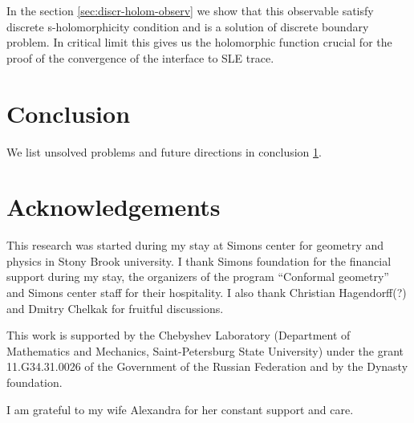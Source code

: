 \documentclass[12pt]{article}
\begin{document}
In the section \ref{sec:discr-holom-observ} we show that this observable satisfy discrete s-holomorphicity
condition and is a solution of discrete boundary problem. In critical limit this gives us the
holomorphic function crucial for the proof of the convergence of the interface to SLE trace.

\section{Conclusion}
\label{sec:conclusion}

We list unsolved problems and future directions in conclusion \ref{sec:conclusion}.


\section*{Acknowledgements}
\label{sec:acknowledgements}

This research was started during my stay at Simons center for geometry and physics in Stony Brook
university. I thank Simons foundation for the financial support during my stay, the organizers of
the program ``Conformal geometry'' and Simons center staff for their hospitality. I also thank
Christian Hagendorff(?) and Dmitry Chelkak for fruitful discussions. 

This work  is supported by
the Chebyshev Laboratory (Department of Mathematics and Mechanics,
Saint-Petersburg State University) under the grant 11.G34.31.0026
of the Government of the Russian Federation and by the Dynasty foundation. 

I am grateful to my wife Alexandra for her constant support and care. 

{} 

\end{document}
